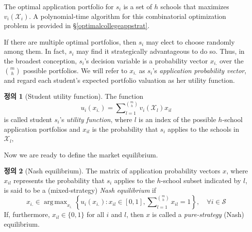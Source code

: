 \documentclass[12pt]{article} %
\DeclareMathOperator*{\argmax}{arg\,max}
\theoremstyle{definition}
\newtheorem{definition}{Definition}
\theoremstyle{definition}
\newtheorem{definition}{정의}
\begin{document}
The optimal application portfolio for $s_i$ is a set of $h$ schools that maximizes $v_i(\mathcal{X}_i)$. A polynomial-time algorithm for this combinatorial optimization problem is provided in \S\ref{optimalcollegeappstrat}.

If there are multiple optimal portfolios, then $s_i$ may elect to choose randomly among them. In fact, $s_i$ may find it strategically advantageous to do so. Thus, in the broadest conception, $s_i$'s decision variable is a probability vector $x_{i.}$ over the $\binom{m}{h}$ possible portfolios. We will refer to $x_{i.}$ as $s_i$'s \emph{application probability vector}, and regard each student's expected portfolio valuation as her utility function.
\begin{definition}[Student utility function]
The function
\begin{equation} \label{mixedstrategystudentutility}
u_i(x_{i.}) = \sum\nolimits_{l=1}^{\binom{m}{h}} v_i(\mathcal{X}_l) x_{il}
\end{equation}
is called student $s_i$'s \emph{utility function}, where $l$ is an index of the possible $h$-school application portfolios and $x_{il}$ is the probability that $s_i$ applies to the schools in $\mathcal{X}_l$,
\end{definition}
Now we are ready to define the market equilibrium.
\begin{definition}[Nash equilibrium]
The matrix of application probability vectors $x$, where $x_{il}$ represents the probability that $s_i$ applies to the $h$-school subset indicated by $l$, is said to be a (mixed-strategy) \emph{Nash equilibrium} if 
\begin{equation}
x_{i.} \in \argmax_{x_{i.}} \left\{ u_i(x_{i.}) : x_{il} \in [0, 1], \sum\nolimits_{l=1}^{\binom{m}{h}} x_{il} = 1 \right\},\quad \forall i \in \mathcal{S}
\end{equation}
If, furthermore, $x_{il} \in \{0, 1\}$ for all $i$ and $l$, then $x$ is called a \emph{pure-strategy} (Nash) equilibrium.
\end{definition}
\end{document}
